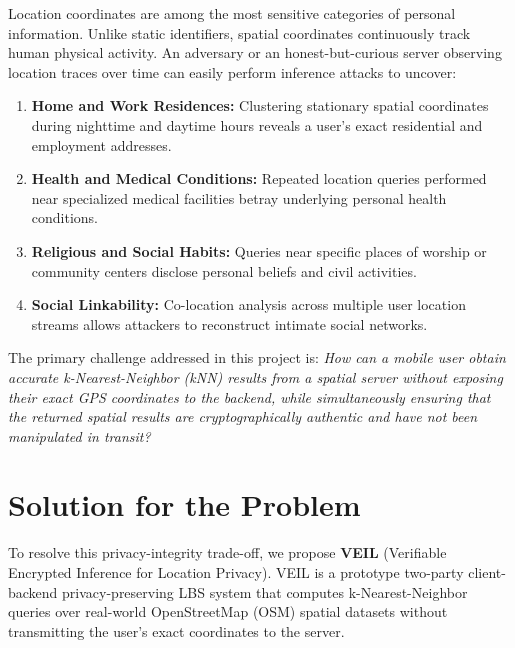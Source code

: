 \documentclass[12pt,a4paper,oneside]{report}
\begin{document}
Location coordinates are among the most sensitive categories of personal information. Unlike static identifiers, spatial coordinates continuously track human physical activity. An adversary or an honest-but-curious server observing location traces over time can easily perform inference attacks to uncover:
\begin{enumerate}
    \item \textbf{Home and Work Residences:} Clustering stationary spatial coordinates during nighttime and daytime hours reveals a user's exact residential and employment addresses.
    \item \textbf{Health and Medical Conditions:} Repeated location queries performed near specialized medical facilities betray underlying personal health conditions.
    \item \textbf{Religious and Social Habits:} Queries near specific places of worship or community centers disclose personal beliefs and civil activities.
    \item \textbf{Social Linkability:} Co-location analysis across multiple user location streams allows attackers to reconstruct intimate social networks.
\end{enumerate}

The primary challenge addressed in this project is: \textit{How can a mobile user obtain accurate k-Nearest-Neighbor (kNN) results from a spatial server without exposing their exact GPS coordinates to the backend, while simultaneously ensuring that the returned spatial results are cryptographically authentic and have not been manipulated in transit?}

\section{Solution for the Problem}
To resolve this privacy-integrity trade-off, we propose \textbf{VEIL} (Verifiable Encrypted Inference for Location Privacy). VEIL is a prototype two-party client-backend privacy-preserving LBS system that computes k-Nearest-Neighbor queries over real-world OpenStreetMap (OSM) spatial datasets without transmitting the user's exact coordinates to the server.
\end{document}
